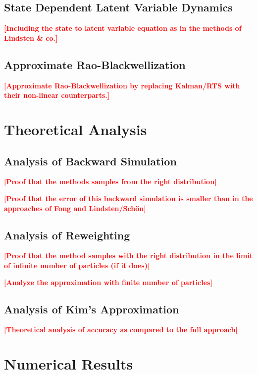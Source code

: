 \documentclass[twocolumn]{autart}    %
\newcommand{\comment}[1]{\textcolor{red}{\textbf{[#1]}}}
\begin{document}
\subsection{State Dependent Latent Variable Dynamics}

\comment{Including the state to latent variable equation as in the
  methods of Lindsten \& co.}

\subsection{Approximate Rao-Blackwellization}

\comment{Approximate Rao-Blackwellization by replacing Kalman/RTS
with their non-linear counterparts.}




\section{Theoretical Analysis}

\subsection{Analysis of Backward Simulation}

\comment{Proof that the methods samples from the right distribution}

\comment{Proof that the error of this backward simulation
is smaller than in the approaches of Fong and Lindsten/Sch\"on}

\subsection{Analysis of Reweighting}

\comment{Proof that the method samples with the right distribution
in the limit of infinite number of particles (if it does)}

\comment{Analyze the approximation with finite number of particles}

\subsection{Analysis of Kim's Approximation}

\comment{Theoretical analysis of accuracy as compared to the full
  approach}


\section{Numerical Results}
\end{document}
